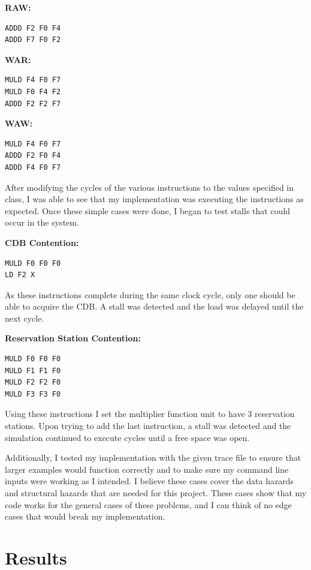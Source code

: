 \documentclass[twocolumn,letterpaper,10pt]{article}
\begin{document}
\bigskip
\textbf{RAW:}
\begin{Verbatim}[frame=single]
ADDD F2 F0 F4
ADDD F7 F0 F2
\end{Verbatim}

\bigskip
\textbf{WAR:}
\begin{Verbatim}[frame=single]
MULD F4 F0 F7
MULD F0 F4 F2
ADDD F2 F2 F7
\end{Verbatim}

\bigskip
\textbf{WAW:}
\begin{Verbatim}[frame=single]
MULD F4 F0 F7
ADDD F2 F0 F4
ADDD F4 F0 F7
\end{Verbatim}

After modifying the cycles of the various instructions to the values specified in class, I was able to see that my implementation was executing the instructions as expected. Once these simple cases were done, I began to test stalls that could occur in the system.

\bigskip
\textbf{CDB Contention:}
\begin{Verbatim}[frame=single]
MULD F0 F0 F0
LD F2 X
\end{Verbatim}

As these instructions complete during the same clock cycle, only one should be able to acquire the CDB. A stall was detected and the load was delayed until the next cycle.

\bigskip
\textbf{Reservation Station Contention:}
\begin{Verbatim}[frame=single]
MULD F0 F0 F0
MULD F1 F1 F0
MULD F2 F2 F0
MULD F3 F3 F0
\end{Verbatim}

Using these instructions I set the multiplier function unit to have 3 reservation stations. Upon trying to add the last instruction, a stall was detected and the simulation continued to execute cycles until a free space was open.

Additionally, I tested my implementation with the given trace file to ensure that larger examples would function correctly and to make sure my command line inputs were working as I intended. I believe these cases cover the data hazards and structural hazards that are needed for this project. These cases show that my code works for the general cases of these problems, and I can think of no edge cases that would break my implementation.

\section{Results}
\end{document}
